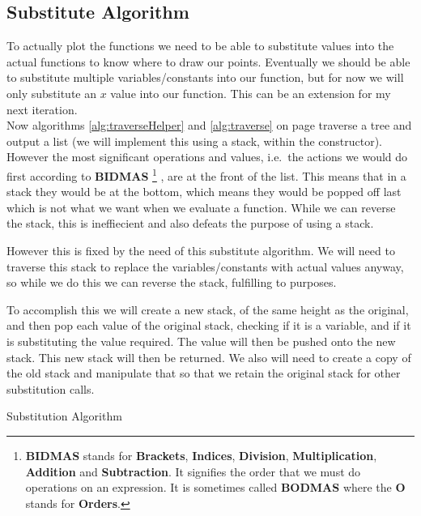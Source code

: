 \documentclass[../../../../../main.tex]{subfiles}
\begin{document}
\subsection{Substitute Algorithm}
To actually plot the functions we need to be able to substitute values into the actual functions to know where to draw our points. Eventually we should be able to substitute multiple variables/constants into our function, but for now we will only substitute an $x$ value into our function. This can be an extension for my next iteration.\\
Now algorithms \ref{alg:traverseHelper} and \ref{alg:traverse} on page \pageref{alg:traverseHelper} traverse a tree and output a list (we will implement this using a stack, within the constructor). However the most significant operations and values, i.e.\ the actions we would do first according to \textbf{BIDMAS}
\footnote{\textbf{BIDMAS} stands for \textbf{Brackets}, \textbf{Indices}, \textbf{Division}, \textbf{Multiplication}, \textbf{Addition} and \textbf{Subtraction}. It signifies the order that we must do operations on an expression. It is sometimes called \textbf{BODMAS} where the \textbf{O} stands for \textbf{Orders}.}
, are at the front of the list. This means that in a stack they would be at the bottom, which means they would be popped off last which is not what we want when we evaluate a function. While we can reverse the stack, this is ineffiecient and also defeats the purpose of using a stack.

However this is fixed by the need of this substitute algorithm. We will need to traverse this stack to replace the variables/constants with actual values anyway, so while we do this we can reverse the stack, fulfilling to purposes.

To accomplish this we will create a new stack, of the same height as the original, and then pop each value of the original stack, checking if it is a variable, and if it is substituting the value required. The value will then be pushed onto the new stack. This new stack will then be returned. We also will need to create a copy of the old stack and manipulate that so that we retain the original stack for other substitution calls.

\begin{algorithm}
\caption{Substitution Algorithm}
\DontPrintSemicolon
{}
\end{algorithm}
\newpage
\end{document}
